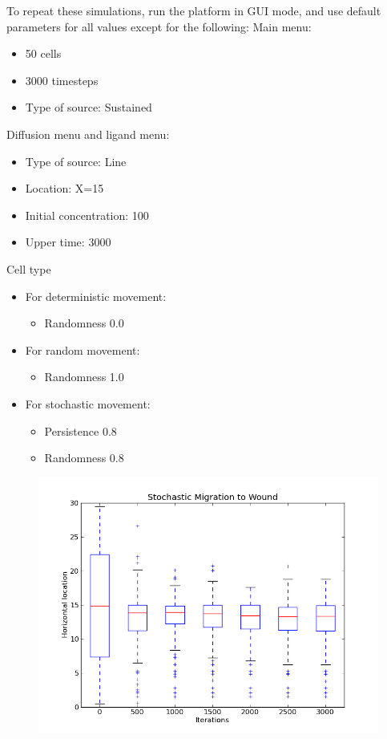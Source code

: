 \documentclass[12pt]{article}
\begin{document}
To repeat these simulations, run the platform in GUI mode, and use default
parameters for all values except for the following:
Main menu: 
\begin{itemize}
  \item 50 cells
  \item 3000 timesteps
  \item Type of source: Sustained
\end{itemize}
Diffusion menu and ligand menu:
\begin{itemize}
\item Type of source: Line
\item Location: X=15
\item Initial concentration: 100
\item Upper time: 3000
\end{itemize}
Cell type
\begin{itemize}
  \item For deterministic movement:
    \begin{itemize}
      \item Randomness 0.0
    \end{itemize}
  \item For random movement:
    \begin{itemize}
      \item Randomness 1.0
    \end{itemize}
  \item For stochastic movement:
    \begin{itemize}
      \item Persistence 0.8
      \item Randomness 0.8
    \end{itemize}
\end{itemize}

\begin{figure}[H]
\centering
\includegraphics[width=11.51cm]{media/StochMigrationtoWound.png}
\end{figure}
\end{document}
